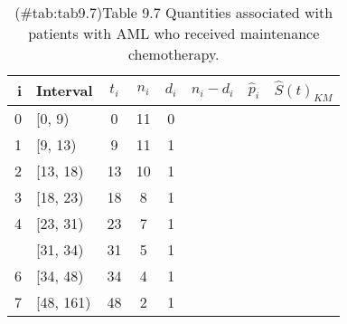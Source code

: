 \documentclass[
]{report}
\begin{document}
\begin{table}[!h]
\centering
\caption{(\#tab:tab9.7)Table 9.7 Quantities associated with patients with AML who received maintenance chemotherapy.}
\centering
\begin{tabular}[t]{rlcccccc}
\toprule
i & Interval & $t_i$ & $n_i$ & $d_i$ & $n_i - d_i$ & $\hat{p}_i$ & $\hat{S}(t)_{KM}$\\
\midrule
0 & {}[0, 9) & 0 & 11 & 0 &  &  & \\
1 & {}[9, 13) & 9 & 11 & 1 &  &  & \\
2 & {}[13, 18) & 13 & 10 & 1 &  &  & \\
3 & {}[18, 23) & 18 & 8 & 1 &  &  & \\
4 & {}[23, 31) & 23 & 7 & 1 &  &  & \\
\addlinespace
5 & {}[31, 34) & 31 & 5 & 1 &  &  & \\
6 & {}[34, 48) & 34 & 4 & 1 &  &  & \\
7 & {}[48, 161) & 48 & 2 & 1 &  &  & \\
\bottomrule
\end{tabular}
\end{table}

  
\end{document}
